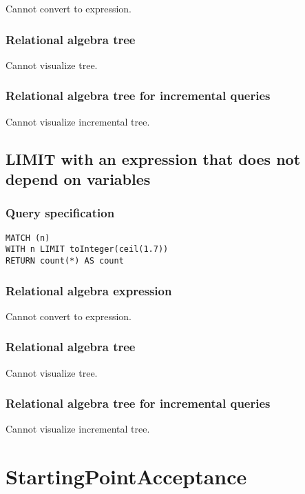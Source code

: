 Cannot convert to expression.

\subsubsection*{Relational algebra tree}

Cannot visualize tree.

\subsubsection*{Relational algebra tree for incremental queries}

Cannot visualize incremental tree.

\subsection{LIMIT with an expression that does not depend on variables}

\subsubsection*{Query specification}

\begin{lstlisting}
MATCH (n)
WITH n LIMIT toInteger(ceil(1.7))
RETURN count(*) AS count
\end{lstlisting}

\subsubsection*{Relational algebra expression}

Cannot convert to expression.

\subsubsection*{Relational algebra tree}

Cannot visualize tree.

\subsubsection*{Relational algebra tree for incremental queries}

Cannot visualize incremental tree.

\section{StartingPointAcceptance}

